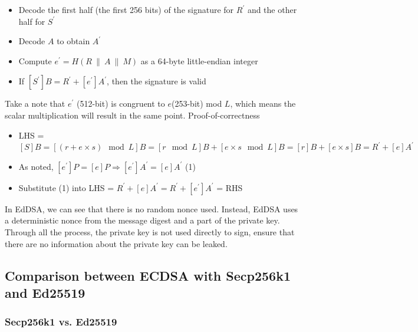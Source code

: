 \begin{itemize}
  \item Decode the first half (the first 256 bits) of the signature for $R^\prime$ and the other half for $S^\prime$
  \item Decode $A$ to obtain $A^\prime$
  \item Compute $e^\prime = H(R \ \| \ A \ \| \ M)$ as a 64-byte little-endian integer
  \item If $[S^\prime]B = R^\prime + [e^\prime]A^\prime$, then the signature is valid
\end{itemize}

Take a note that $e^\prime$ (512-bit) is congruent to $e$(253-bit) mod $L$, which means the scalar multiplication will result in the same point. Proof-of-correctness

\begin{itemize}
  \item LHS = $[S]B = [(r + e \times s) \mod L]B = [r \mod L]B + [e \times s \mod L]B = [r]B + [e \times s]B = R^\prime + [e]A^\prime$
  \item As noted, $[e^\prime]P = [e]P \Rightarrow [e^\prime]A^\prime = [e]A^\prime$ (1)
  \item Substitute (1) into LHS = $R^\prime + [e]A^\prime = R^\prime + [e^\prime]A^\prime$ = RHS
\end{itemize}

In EdDSA, we can see that there is no random nonce used. Instead, EdDSA uses a deterministic nonce from the message digest and a part of the private key. Through all the process, the private key is not used directly to sign, ensure that there are no information about the private key can be leaked.

\subsection{Comparison between ECDSA with Secp256k1 and Ed25519}

\subsubsection{Secp256k1 vs. Ed25519}

